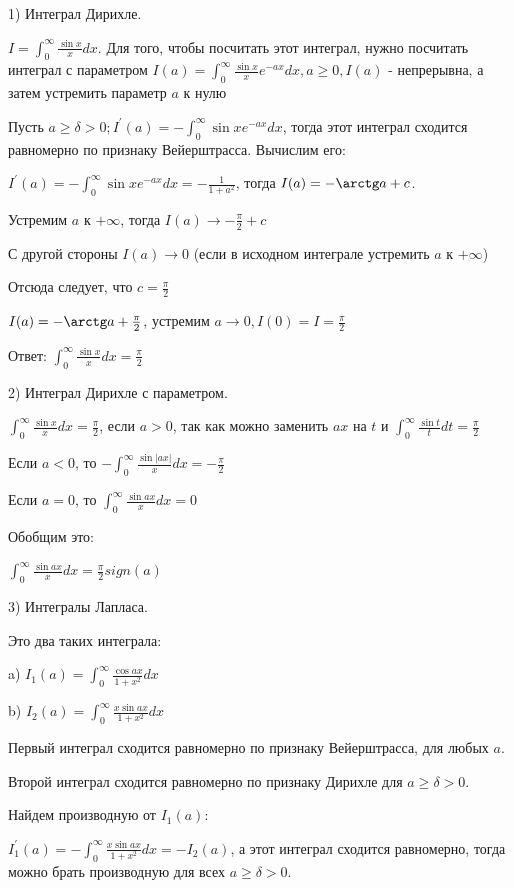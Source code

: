 \documentclass[12pt]{article}
\begin{document}
1) Интеграл Дирихле.\par
$I = \int_0^{\infty} \frac{\sin x}{x} dx$. Для того, чтобы посчитать этот интеграл, нужно посчитать интеграл с параметром $I(a) = \int_0^\infty \frac{\sin x}{x} e^{-ax} dx, a \geq 0, I(a)$ - непрерывна, а затем устремить параметр $a$ к нулю\par
Пусть $a \geq \delta > 0; I^{'}(a) = -\int_0^\infty \sin x e^{-ax} dx$, тогда этот интеграл сходится равномерно по признаку Вейерштрасса. Вычислим его:\par
$I^{'}(a) = -\int_0^\infty \sin x e^{-ax} dx = - \frac{1}{1+a^2}$, тогда $I(a) = -\arctg a + c$.\par
Устремим $a$ к $+\infty$, тогда $I(a) \to -\frac{\pi}{2} + c$\par
С другой стороны $I(a) \to 0$ (если в исходном интеграле устремить $a$ к $+\infty$)\par
Отсюда следует, что $c = \frac{\pi}{2}$\par
$I(a) = -\arctg a + \frac{\pi}{2}$, устремим $a \to 0, I(0) = I = \frac{\pi}{2}$\par
Ответ: $\int_0^\infty \frac{\sin x}{x} dx = \frac{\pi}{2}$\par
2) Интеграл Дирихле с параметром.\par
$\int_0^\infty \frac{\sin x}{x} dx = \frac{\pi}{2}$, если $a > 0$, так как можно заменить $ax$ на $t$ и $\int_0^\infty \frac{\sin t}{t} dt = \frac{\pi}{2}$\par
Если $a < 0$, то $-\int_0^\infty \frac{\sin {|ax|}}{x} dx = -\frac{\pi}{2}$\par
Если $a = 0$, то $\int_0^\infty \frac{\sin {ax}}{x} dx = 0$\par
Обобщим это:\par
$\int_0^\infty \frac{\sin{ax}}{x} dx = \frac{\pi}{2} sign (a)$\par
3) Интегралы Лапласа.\par
Это два таких интеграла:\par
a) $I_1 (a) = \int_0^\infty \frac{\cos{ax}}{1+x^2}dx$\par
b) $I_2 (a) = \int_0^\infty \frac{x \sin{ax}}{1+x^2}dx$\par
Первый интеграл сходится равномерно по признаку Вейерштрасса, для любых $a$.\par
Второй интеграл сходится равномерно по признаку Дирихле для $a \geq \delta > 0$.\par
Найдем производную от $I_1(a)$:\par
$I_1^{'}(a) = -\int_0^\infty \frac{x\sin{ax}}{1+x^2} dx = -I_2(a)$, а этот интеграл сходится равномерно, тогда можно брать производную для всех $a \geq \delta >0$.\par
\end{document}
